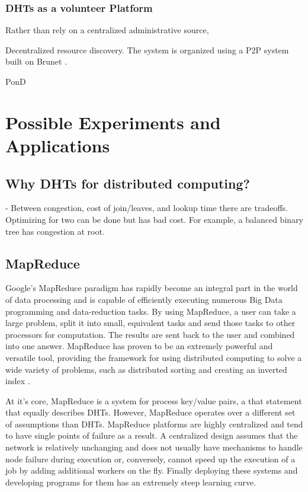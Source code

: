 \documentclass[10pt,letterpaper,twoside]{report}
\begin{document}



\subsection{DHTs as a volunteer Platform}
Rather than rely on a centralized administrative source,


Decentralized resource discovery.
The system is organized using a P2P system built on Brunet \cite{brunet}.





PonD \cite{lee2012pond}



\chapter{Possible Experiments and Applications}

\section{Why DHTs for distributed computing?}

\cite{malkhi2001viceroy} -  Between congestion, cost of join/leaves, and lookup time there are tradeoffs.  
Optimizing for two can be done but has bad cost.
For example, a balanced binary tree has congestion at root.


\section{MapReduce}

Google's MapReduce \cite{mapreduce} paradigm has rapidly become an integral part in the world of data processing and is capable of efficiently executing numerous Big Data programming and data-reduction tasks.  
By using MapReduce, a user can take a large problem, split it into small, equivalent tasks and send those tasks to other processors for computation.  
The results are sent back to the user and combined into one answer.  
MapReduce has proven to be an extremely powerful and versatile tool, providing the framework for using distributed computing to solve a wide variety of problems, such as distributed sorting and creating an inverted index \cite{mapreduce}. 

At it's core, MapReduce \cite{mapreduce} is a system for process key/value pairs, a that statement that equally describes DHTs.
However, MapReduce operates over a different set of assumptions \cite{hadoopAssumptions} than DHTs.
MapReduce platforms are highly centralized and tend to have single points of failure\cite{shvachko2010hadoop} as a result.   
A centralized design assumes that the network is relatively unchanging and does not usually have mechanisms to handle node failure during execution or, conversely, cannot speed up the execution of a job by adding additional workers on the fly.
Finally deploying these systems and developing programs for them has an extremely steep learning curve.
\end{document}
